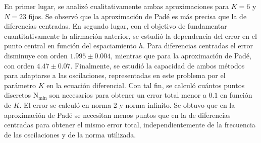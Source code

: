 \documentclass[aps,prb,twocolumn,superscriptaddress,floatfix,longbibliography]{revtex4-2}
\newcounter{para}
\begin{document}
En primer lugar, se analizó cualitativamente ambas aproximaciones para $K = 6$ y $N = 23$ fijos. Se observó que la aproximación de Padé es más precisa que la de diferencias centradas. En segundo lugar, con el objetivo de fundamentar cuantitativamente la afirmación anterior, se estudió la dependencia del error en el punto central en función del espaciamiento $h$. Para diferencias centradas el error disminuye con orden $1.995 \pm 0.004$, mientras que para la aproximación de Padé, con orden $ 4.47 \pm 0.07$. Finalmente, se estudió la capacidad de ambos métodos para adaptarse a las oscilaciones, representadas en este problema por el parámetro $K$ en la ecuación diferencial. Con tal fin, se calculó cuántos puntos discretos $\mathrm{N_{min}}$ son necesarios para obtener un error total menor a $0.1$ en función de $K$. El error se calculó en norma 2 y norma infinito. Se obtuvo que en la aproximación de Padé se necesitan menos puntos que en la de diferencias centradas para obtener el mismo error total, independientemente de la frecuencia de las oscilaciones y de la norma utilizada.


\end{document}
